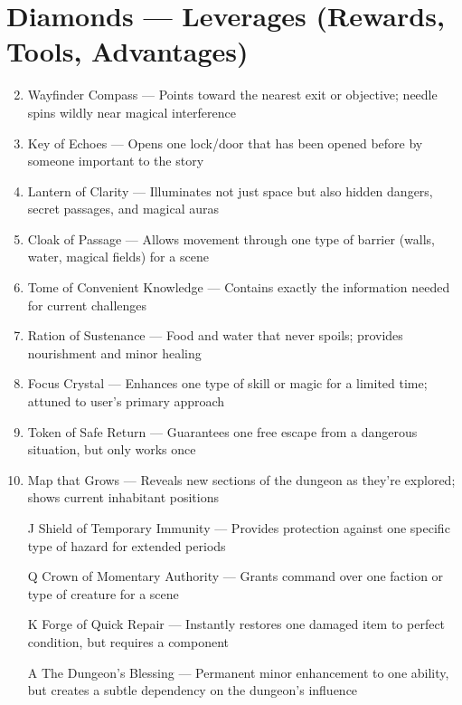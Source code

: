 \section*{Diamonds --- Leverages (Rewards, Tools, Advantages)}
\label{sec:dungeon-leverages}
\begin{enumerate}
\setcounter{enumi}{1}
\item Wayfinder Compass --- Points toward the nearest exit or objective; needle spins wildly near magical interference
\item Key of Echoes --- Opens one lock/door that has been opened before by someone important to the story
\item Lantern of Clarity --- Illuminates not just space but also hidden dangers, secret passages, and magical auras
\item Cloak of Passage --- Allows movement through one type of barrier (walls, water, magical fields) for a scene
\item Tome of Convenient Knowledge --- Contains exactly the information needed for current challenges
\item Ration of Sustenance --- Food and water that never spoils; provides nourishment and minor healing
\item Focus Crystal --- Enhances one type of skill or magic for a limited time; attuned to user's primary approach
\item Token of Safe Return --- Guarantees one free escape from a dangerous situation, but only works once
\item Map that Grows --- Reveals new sections of the dungeon as they're explored; shows current inhabitant positions
\item[J] Shield of Temporary Immunity --- Provides protection against one specific type of hazard for extended periods
\item[Q] Crown of Momentary Authority --- Grants command over one faction or type of creature for a scene
\item[K] Forge of Quick Repair --- Instantly restores one damaged item to perfect condition, but requires a component
\item[A] The Dungeon's Blessing --- Permanent minor enhancement to one ability, but creates a subtle dependency on the dungeon's influence
\end{enumerate}

